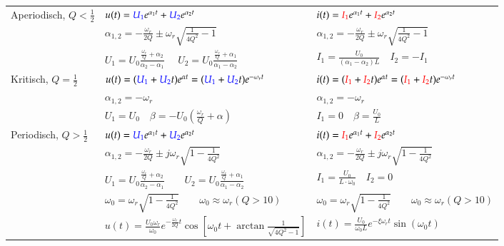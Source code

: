 \begin{tabular}{| p{4cm} | p{7cm} | p{7cm} |}
            Aperiodisch, $ Q < \frac{1}{2}$ &
            $u(t) = \textcolor{blue}{U_1} e^{\alpha_1 t} + \textcolor{blue}{U_2} e^{\alpha_2 t}$ &
            $i(t) = \textcolor{red}{I_1}  e^{\alpha_1 t} + \textcolor{red}{I_2} e^{\alpha_2 t}$ \\
            &
            $\alpha_{1,2} = - \frac{\omega_r}{2 Q} \pm \omega_r \sqrt{\frac{1}{4 Q^2} - 1}$ &
            $\alpha_{1,2} = - \frac{\omega_r}{2 Q} \pm \omega_r \sqrt{\frac{1}{4 Q^2} - 1}$ \\
            &
            $U_1 = U_0 \frac{\frac{\omega_r}{Q} + \alpha_2}{\alpha_2 - \alpha_1} \quad$ $U_2 = U_0 \frac{\frac{\omega_r}{Q} + \alpha_1}{\alpha_1 - \alpha_2}$ &
            $I_1 = \frac{U_0}{(\alpha_1 - \alpha_2)L} \quad I_2 = -I_1$ \\
            \hline
            
            Kritisch, $ Q = \frac{1}{2}$ &
            $u(t) = (\textcolor{blue}{U_1} + \textcolor{blue}{U_2} t) e^{\alpha t} = (\textcolor{blue}{U_1} + \textcolor{blue}{U_2} t) e^{- \omega_r t}$ &
            $i(t) = (\textcolor{red}{I_1}  + \textcolor{red}{I_2} t)  e^{\alpha t} = (\textcolor{red}{I_1} + \textcolor{red}{I_2} t)   e^{- \omega_r t}$ \\ 
            &
            $\alpha_{1,2} = - \omega_r$ & 
            $\alpha_{1,2} = - \omega_r$ \\
            &
            $U_1 = U_0 \quad \beta = -U_0 \left(\frac{\omega_r}{Q}+\alpha \right)$ & 
            $I_1 = 0 \quad \beta = \frac{U_0}{L}$ \\
            \hline
              
            Periodisch, $ Q > \frac{1}{2}$ &
            $u(t) = \textcolor{blue}{U_1} e^{\alpha_1 t} + \textcolor{blue}{U_2} e^{\alpha_2 t} $ &
            $i(t) = \textcolor{red}{I_1}  e^{\alpha_1 t} + \textcolor{red}{I_2}  e^{\alpha_2 t} $ \\
            &
            $\alpha_{1,2} = - \frac{\omega_r}{2 Q} \pm j \omega_r \sqrt{1 - \frac{1}{4 Q^2}}$ &
            $\alpha_{1,2} = - \frac{\omega_r}{2 Q} \pm j \omega_r \sqrt{1 - \frac{1}{4 Q^2}}$ \\
            &
            $U_1 = U_0\frac{\frac{\omega_r}{Q} + \alpha_2}{\alpha_2 - \alpha_1} \qquad U_2 = U_0\frac{\frac{\omega_r}{Q} + \alpha_1}{\alpha_1 - \alpha_2}$ &
            $I_1 =  \frac{U_0}{L \cdot \omega_0} \quad I_2 = 0$ \\
            &
            $\omega_0 = \omega_r \sqrt{1 - \frac{1}{4 Q^2}} \qquad \omega_0 \approx \omega_r (Q > 10)$ &
            $\omega_0 = \omega_r \sqrt{1 - \frac{1}{4 Q^2}} \qquad \omega_0 \approx \omega_r (Q > 10)$ \\
            &
            $u(t) = \frac{U_0 \omega_r}{\omega_0} e^{- \frac{\omega_r}{2Q} t} \cos{[\omega_0 t + \arctan{\frac{1}{\sqrt{4 Q^2 -1}}}]}$ &
            $i(t) = \frac{U_0}{\omega_0 L} e^{-\xi  \omega_r  t} \sin{(\omega_0 t)}$ \\
            \hline
        \end{tabular}
        \renewcommand{\arraystretch}{\arraystretchOriginal}

